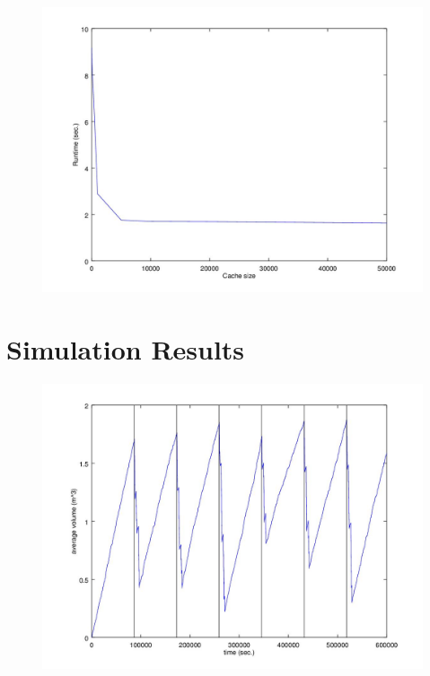\documentclass{article}
\begin{document}
			\begin{figure}[H]
			\centering
				\includegraphics[width=.8\columnwidth]{resources/cache_size.jpg}
				\label{fig:fig4}
			\end{figure}
			

	\section{Simulation Results}
			
			\begin{figure}[H]
			\centering
				\includegraphics[width=.8\columnwidth]{resources/occupancy_three_neighborhoods.jpg}
				\label{fig:fig4}
			\end{figure}
\end{document}
